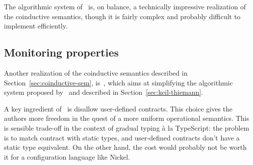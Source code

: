 \documentclass[sigplan,10pt,review,anonymous]{acmart}
\newcommand{\nickel}[1]{\lstinline[language=nickel]{#1}}
\begin{document}
The algorithmic system of~\cite{KeilThiemannUnionIntersection} is, on
balance, a technically impressive realization of the coinductive
semantics, though it is fairly complex and probably difficult to
implement efficiently.

\subsection{Monitoring properties}
\label{sec:will-morr-wadl}

Another realization of the coinductive semantics described in
Section~\ref{sec:coinductive-sem}, is~\cite{RootCauseOfBlame}, which
aims at simplifying the algorithmic system proposed
by~\cite{KeilThiemannUnionIntersection} and described in
Section~\ref{sec:keil-thiemann}.

A key ingredient of~\cite{RootCauseOfBlame} is disallow user-defined
contracts. This choice gives the authors more freedom in the quest of
a more uniform operational semantics. This is sensible trade-off in
the context of gradual typing à la TypeScript: the problem is to match
contract with static types, and user-defined contracts don't have a
static type equivalent. On the other hand, the cost would probably not
be worth it for a configuration language like Nickel.

%


\end{document}
